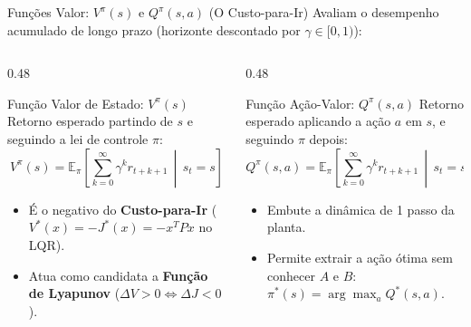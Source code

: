 \documentclass[11pt, aspectratio=169]{beamer}
\begin{document}
\begin{frame}{Funções Valor: $V^\pi(s)$ e $Q^\pi(s,a)$ (O Custo-para-Ir)}
    Avaliam o desempenho acumulado de longo prazo (horizonte descontado por $\gamma \in [0, 1)$):
    
    \vspace{0.2cm}
    \begin{columns}[T]
        \begin{column}{0.48\textwidth}
            \begin{block}{Função Valor de Estado: $V^\pi(s)$}
                Retorno esperado partindo de $s$ e seguindo a lei de controle $\pi$:
                \[ V^\pi(s) = \mathbb{E}_\pi \left[ \sum_{k=0}^{\infty} \gamma^k r_{t+k+1} \,\middle|\, s_t = s \right] \]
                \begin{itemize}
                    \item É o negativo do \textbf{Custo-para-Ir} ($V^*(x) = -J^*(x) = -x^T P x$ no LQR).
                    \item Atua como candidata a \textbf{Função de Lyapunov} ($\Delta V > 0 \iff \Delta J < 0$).
                \end{itemize}
            \end{block}
        \end{column}
        
        \begin{column}{0.48\textwidth}
            \begin{block}{Função Ação-Valor: $Q^\pi(s,a)$}
                Retorno esperado aplicando a ação $a$ em $s$, e seguindo $\pi$ depois:
                \[ Q^\pi(s,a) = \mathbb{E}_\pi \left[ \sum_{k=0}^{\infty} \gamma^k r_{t+k+1} \,\middle|\, s_t = s, a_t = a \right] \]
                \begin{itemize}
                    \item Embute a dinâmica de 1 passo da planta.
                    \item Permite extrair a ação ótima sem conhecer $A$ e $B$: $\pi^*(s) = \arg\max_a Q^*(s,a)$.
                \end{itemize}
            \end{block}
        \end{column}
    \end{columns}
\end{frame}
\end{document}
